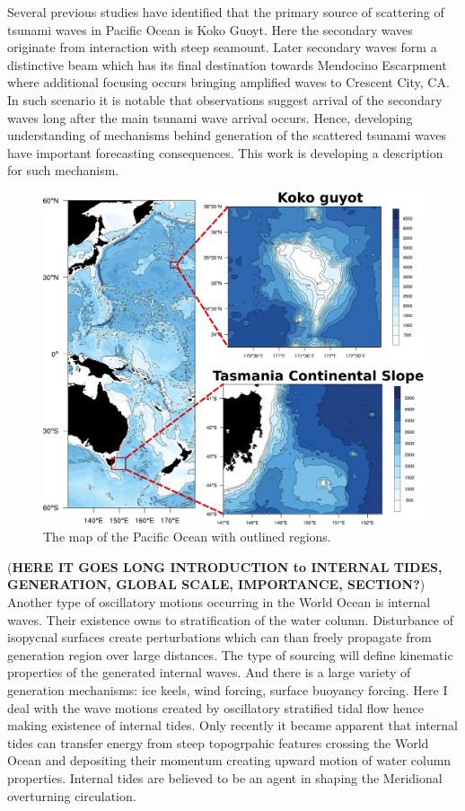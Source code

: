 Several previous studies have identified that the primary source of scattering of tsunami waves in Pacific Ocean is Koko Guoyt. Here the secondary waves originate from interaction with steep seamount. Later secondary waves form a distinctive beam which has its final destination towards Mendocino Escarpment where additional focusing occurs bringing amplified waves to Crescent City, CA. In such scenario it is notable that observations suggest arrival of the secondary waves long after the main tsunami wave arrival occurs. Hence, developing understanding of mechanisms behind generation of the scattered tsunami waves have important forecasting consequences. This work is developing a description for such mechanism.\\

\begin{figure}
\includegraphics[scale=0.5]{../figures/map_w_places.pdf}
\caption{The map of the Pacific Ocean with outlined regions.}
\end{figure}
(\textbf{HERE IT GOES LONG INTRODUCTION to INTERNAL TIDES, GENERATION, GLOBAL SCALE, IMPORTANCE, SECTION?})\\
Another type of oscillatory motions occurring in the World Ocean is internal waves. Their existence owns to stratification of the water column. Disturbance of isopycnal surfaces create perturbations which can than freely propagate from generation region over large distances. The type of sourcing will define kinematic properties of the generated internal waves. And there is a large variety of generation mechanisms: ice keels, wind forcing, surface buoyancy forcing. Here I deal with the wave motions created by oscillatory stratified tidal flow hence making existence of internal tides. Only recently it became apparent that internal tides can transfer energy from steep topogrpahic features crossing the World Ocean and depositing their momentum creating upward motion of water column properties. Internal tides are believed to be an agent in shaping the Meridional overturning circulation.\\
